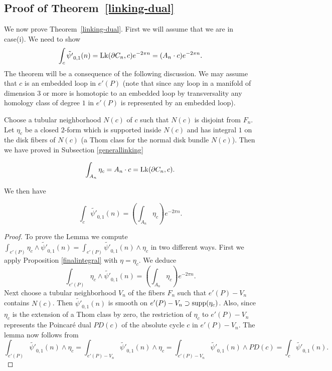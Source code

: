 \subsection{Proof of Theorem~\ref{linking-dual}}\label{W-currents}

We now prove Theorem~\ref{linking-dual}. First we will assume that we are in case(i). We need to show  
\[
\int_c  \tilde{\psi'}_{0,1}(n) = \operatorname{Lk}(\partial C_n,c) e^{-2\pi n} =  (A_n \cdot c) e^{-2\pi n}.
\]
The theorem will be a consequence of the following discussion.  
We may assume that $c$ is an embedded loop in $e'(P)$ (note that since any loop in a manifold of dimension $3$ or more is homotopic to an embedded loop by transversality any homology class of degree $1$ in $e'(P)$ is represented by an embedded loop). 

Choose a tubular neighborhood $N(c)$ of $c$ such that $N(c)$ is disjoint from $F_n$. Let $\eta_c$ be a closed $2$-form which is supported inside $N(c)$ and has integral $1$ on the disk fibers of $N(c)$ (a Thom class for the normal disk bundle $N(c)$).
Then we have proved in Subsection \ref{generallinking}  

\begin{lemma}\label{integrallink}
\begin{equation} \label{secondformula}
\int_{A_n} \eta_c= A_n \cdot  c= \operatorname{Lk}(\partial C_n, c).
\end{equation}
\end{lemma}


We then have

\begin{lemma} \label{laststep}
\begin{equation*} \label{fifthformula}
\int_c \tilde{\psi'}_{0,1}(n) = \left(\int_{A_n} \eta_c\right) e^{- 2\pi n}.
\end{equation*}
\end{lemma}

\begin{proof}
To prove the Lemma we compute $\int_{e'(P)} \eta_c \wedge  \tilde{\psi'}_{0,1}(n)= \int_{e'(P)} \tilde{\psi'}_{0,1}(n) \wedge \eta_c$ in two different ways. First we apply Proposition \ref{finalintegral} with $\eta = \eta_c$.  We deduce
\begin{equation*}\label{thirdformula}
\int_{e'(P)}\eta_c \wedge \tilde{\psi'}_{0,1}(n) = \left(\int_{A_n} \eta_c\right) e^{-2 \pi n}.
\end{equation*}
Next choose a tubular neighborhood $V_n$ of the fibers $F_n$   such that $e'(P) - V_n$
contains $N(c)$.  Then $\tilde{\psi'}_{0,1}(n)$ is smooth on $e'(P) - V_n \supset \operatorname{supp} (\eta_c)$.  Also, since $\eta_c$ is the extension of a Thom class by zero,  the restriction of  $\eta_c$ to $e'(P) - V_n$ represents the Poincar\'e dual $PD(c)$ of the absolute cycle $c$ in 
$e'(P) -V_n$. The lemma now follows from 
\begin{equation*}
\int_{e'(P)} \tilde{\psi'}_{0,1}(n) \wedge \eta_c   = \int_{e'(P)- V_n} \tilde{\psi'}_{0,1}(n) \wedge \eta_c = \int_{e'(P)- V_n} \tilde{\psi'}_{0,1}(n) \wedge PD(c)
  = \int_{c} \tilde{\psi'}_{0,1}(n). 
\end{equation*}
\end{proof}

